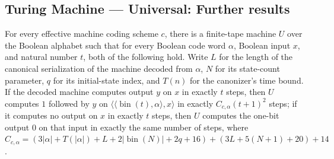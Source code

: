 \subsection*{Turing Machine --- Universal: Further results}

\begin{theorem}
\label{Turing.timed_universal_concrete}
\leanok
{}
For every effective machine coding scheme $c$, there is a finite-tape machine $U$ over
the Boolean alphabet such that for every Boolean code word $\alpha$, Boolean input $x$,
and natural number $t$, both of the following hold. Write $L$ for the length of the
canonical serialization of the machine decoded from $\alpha$, $N$ for its state-count
parameter, $q$ for its initial-state index, and $T(n)$ for the canonizer's time bound.
If the decoded machine computes output $y$ on $x$ in exactly $t$ steps, then $U$
computes $1$ followed by $y$ on
$\langle\langle\operatorname{bin}(t),\alpha\rangle,x\rangle$ in exactly
$C_{c,\alpha}(t+1)^2$ steps; if it computes no output on $x$ in exactly $t$ steps, then
$U$ computes the one-bit output $0$ on that input in exactly the same number of steps,
where
$C_{c,\alpha}=(3|\alpha|+T(|\alpha|)+L+2|\operatorname{bin}(N)|+2q+16)+(3L+5(N+1)+20)+14$.
\end{theorem}
